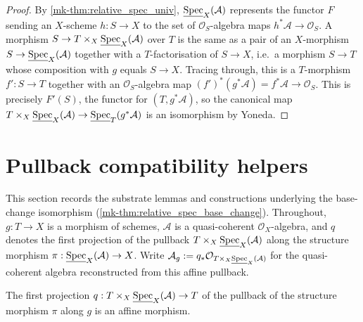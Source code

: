 \begin{proof}
  By \ref{mk-thm:relative_spec_univ}, \(\underline{\operatorname{Spec}}_X(\mathcal{A})\) represents
  the functor \(F\) sending an \(X\)-scheme \(h : S \to X\) to the set of
  \(\mathcal{O}_S\)-algebra maps \(h^*\mathcal{A} \to \mathcal{O}_S\). A morphism
  \(S \to T \times_X \underline{\operatorname{Spec}}_X(\mathcal{A})\) over \(T\) is the same as a pair of an
  \(X\)-morphism \(S \to \underline{\operatorname{Spec}}_X(\mathcal{A})\) together with a \(T\)-factorisation
  of \(S \to X\), i.e.\ a morphism \(S \to T\) whose composition with \(g\) equals
  \(S \to X\). Tracing through, this is a \(T\)-morphism \(f' : S \to T\) together with an
  \(\mathcal{O}_S\)-algebra map \((f')^*(g^*\mathcal{A}) = f^*\mathcal{A} \to \mathcal{O}_S\).
  This is precisely \(F'(S)\), the functor for \((T, g^*\mathcal{A})\), so the canonical map
  \(T \times_X \underline{\operatorname{Spec}}_X(\mathcal{A}) \to \underline{\operatorname{Spec}}_T(g^*\mathcal{A})\)
  is an isomorphism by Yoneda.
\end{proof}

\section{Pullback compatibility helpers}
\label{mk-sec:relspec_pullback_helpers}

This section records the substrate lemmas and constructions underlying the
base-change isomorphism (\ref{mk-thm:relative_spec_base_change}). Throughout,
\(g : T \to X\) is a morphism of schemes, \(\mathcal{A}\) is a quasi-coherent
\(\mathcal{O}_X\)-algebra, and \(q\) denotes the first projection of the pullback
\(T \times_X \underline{\operatorname{Spec}}_X(\mathcal{A})\) along the structure morphism
\(\pi : \underline{\operatorname{Spec}}_X(\mathcal{A}) \to X\). Write
\(\mathcal{A}_g := q_* \mathcal{O}_{T \times_X \underline{\operatorname{Spec}}_X(\mathcal{A})}\)
for the quasi-coherent algebra reconstructed from this affine pullback.

\begin{lemma}
  \label{mk-lem:relspec_pullback_fst_isaffinehom}

  The first projection
  \(q : T \times_X \underline{\operatorname{Spec}}_X(\mathcal{A}) \to T\) of the pullback of the
  structure morphism \(\pi\) along \(g\) is an affine morphism.
\end{lemma}

